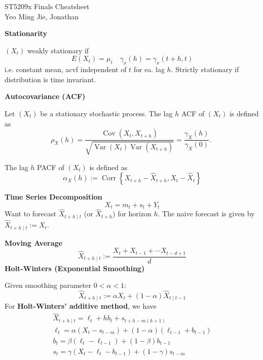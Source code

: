 \documentclass[a4paper]{article}
\newcommand{\subheading}[1]{{\scriptsize\textbf{#1}}}
\begin{document}
\scriptsize                         %
\setlength\parindent{0pt}           %
\setlength{\abovedisplayskip}{3pt}  %
\setlength{\belowdisplayskip}{3pt}  %

\begin{center}
  {\large ST5209x Finals Cheatsheet}\\{Yeo Ming Jie, Jonathan}
\end{center}

\begin{multicols*}{4}


\subheading{Stationarity}

$\left(X_{t}\right)$ weakly stationary if
$$
E(X_t) = \mu_t \quad \gamma_x(h) = \gamma_x(t+h,t)
$$
i.e. constant mean, acvf independent of $t$ for ea. lag $h$. 
Strictly stationary if distribution is time invariant.

\subheading{Autocovariance (ACF)}

Let $\left(X_{t}\right)$ be a stationary stochastic process. The lag $h$ ACF of $\left(X_{t}\right)$ is defined as
$$
\rho_{X}(h)=\frac{\operatorname{Cov}\left(X_{t}, X_{t+h}\right)}{\sqrt{\operatorname{Var}\left(X_{t}\right) \operatorname{Var}\left(X_{t+h}\right)}}=\frac{\gamma_{X}(h)}{\gamma_{X}(0)} \text {. }
$$

The lag $h$ PACF of $\left(X_{t}\right)$ is defined as
$$
\alpha_{X}(h):=\operatorname{Corr}\left\{X_{t+h}-\hat{X}_{t+h}, X_{t}-\hat{X}_{t}\right\}
$$

\smallskip
\hline
\smallskip

\subheading{Time Series Decomposition}
$$
X_{t}=m_{t}+s_{t}+Y_{t}
$$
Want to forecast $\hat{X}_{t+h \mid t}$ (or $\hat{X}_{t+h}$) for 
horizon $h$. The naive forecast is given by $\hat{X}_{t+h \mid t}:=X_{t}$.

\subheading{Moving Average}
$$
\hat{X}_{t+h \mid t}:=\frac{X_{t}+X_{t-1}+\cdots X_{t-d+1}}{d}
$$
\subheading{Holt-Winters (Exponential Smoothing)}

Given smoothing parameter $0< \alpha <1$:
$$
\hat{X}_{t+h \mid t}:=\alpha X_{t}+(1-\alpha) \hat{X}_{t \mid t-1}
$$
For \textbf{Holt-Winters' additive method}, we have
$$
\begin{gathered}
\hat{X}_{t+h \mid t} = \ell _t + h b_t + s_{t+h-m(k+1)} \\
\ell _t = \alpha (X_t - s_{t-m}) + (1-\alpha)(\ell _{t-1} + b_{t-1}) \\
b_t = \beta(\ell _t - \ell _{t-1}) + (1-\beta)b_{t-1} \\
s_t = \gamma(X_t - \ell _t - b_{t-1}) + (1-\gamma)s_{t-m}
\end{gathered}
$$


\end{multicols*}
\end{document}
